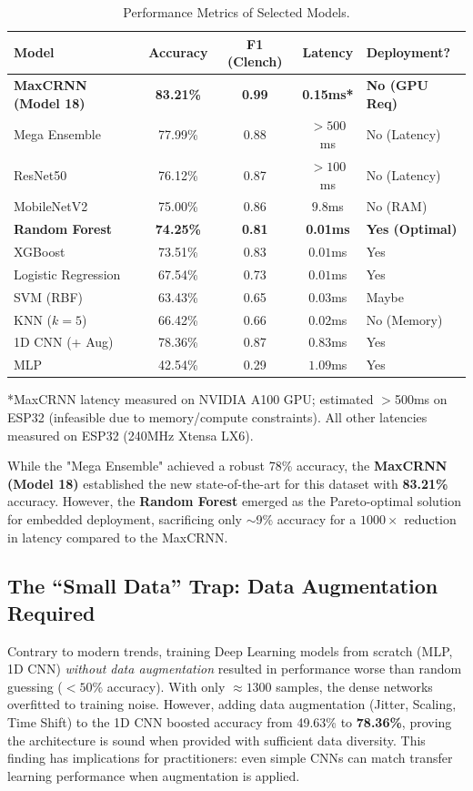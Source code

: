 \documentclass{article}
\begin{document}
\begin{table}[ht]
    \centering
    \caption{Performance Metrics of Selected Models.}
    \label{tab:results}
    \begin{tabular}{l c c c l}
        \hline
        \textbf{Model} & \textbf{Accuracy} & \textbf{F1 (Clench)} & \textbf{Latency} & \textbf{Deployment?} \\
        \hline
        \textbf{MaxCRNN (Model 18)} & \textbf{83.21\%} & \textbf{0.99} & \textbf{0.15ms*} & \textbf{No (GPU Req)} \\
        Mega Ensemble & 77.99\% & 0.88 & $>500$ms & No (Latency) \\
        ResNet50 & 76.12\% & 0.87 & $>100$ms & No (Latency) \\
        MobileNetV2 & 75.00\% & 0.86 & $9.8$ms & No (RAM) \\
        \textbf{Random Forest} & \textbf{74.25\%} & \textbf{0.81} & \textbf{0.01ms} & \textbf{Yes (Optimal)} \\
        XGBoost & 73.51\% & 0.83 & $0.01$ms & Yes \\
        Logistic Regression & 67.54\% & 0.73 & $0.01$ms & Yes \\
        SVM (RBF) & 63.43\% & 0.65 & $0.03$ms & Maybe \\
        KNN ($k=5$) & 66.42\% & 0.66 & $0.02$ms & No (Memory) \\
        1D CNN (+ Aug) & 78.36\% & 0.87 & $0.83$ms & Yes \\
        MLP & 42.54\% & 0.29 & $1.09$ms & Yes \\
        \hline
    \end{tabular}

    \vspace{0.5em}
    \footnotesize{*MaxCRNN latency measured on NVIDIA A100 GPU; estimated $>$500ms on ESP32 (infeasible due to memory/compute constraints). All other latencies measured on ESP32 (240MHz Xtensa LX6).}
\end{table}

While the "Mega Ensemble" achieved a robust 78\% accuracy, the \textbf{MaxCRNN (Model 18)} established the new state-of-the-art for this dataset with \textbf{83.21\%} accuracy. However, the \textbf{Random Forest} emerged as the Pareto-optimal solution for embedded deployment, sacrificing only $\sim$9\% accuracy for a $1000\times$ reduction in latency compared to the MaxCRNN.

\subsection{The ``Small Data'' Trap: Data Augmentation Required}
Contrary to modern trends, training Deep Learning models from scratch (MLP, 1D CNN) \textit{without data augmentation} resulted in performance worse than random guessing ($<50\%$ accuracy). With only $\approx 1300$ samples, the dense networks overfitted to training noise. However, adding data augmentation (Jitter, Scaling, Time Shift) to the 1D CNN boosted accuracy from 49.63\% to \textbf{78.36\%}, proving the architecture is sound when provided with sufficient data diversity. This finding has implications for practitioners: even simple CNNs can match transfer learning performance when augmentation is applied.
\end{document}
